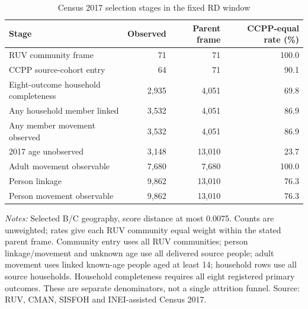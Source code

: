 \begin{table}[!htbp]\centering\small
\caption{Census 2017 selection stages in the fixed RD window}
\label{tab:rd_mechanisms_selection_flow}
\begin{tabular}{lrrr}\toprule
Stage & Observed & Parent frame & CCPP-equal rate (\%) \\
\midrule
RUV community frame &        71 &        71 & 100.0 \\
CCPP source-cohort entry &        64 &        71 &  90.1 \\
Eight-outcome household completeness &     2,935 &     4,051 &  69.8 \\
Any household member linked &     3,532 &     4,051 &  86.9 \\
Any member movement observed &     3,532 &     4,051 &  86.9 \\
2017 age unobserved &     3,148 &    13,010 &  23.7 \\
Adult movement observable &     7,680 &     7,680 & 100.0 \\
Person linkage &     9,862 &    13,010 &  76.3 \\
Person movement observable &     9,862 &    13,010 &  76.3 \\
\bottomrule\end{tabular}
\parbox{0.98\linewidth}{\footnotesize\textit{Notes:} Selected B/C geography, score distance at most 0.0075. Counts are unweighted; rates give each RUV community equal weight within the stated parent frame. Community entry uses all RUV communities; person linkage/movement and unknown age use all delivered source people; adult movement uses linked known-age people aged at least 14; household rows use all source households. Household completeness requires all eight registered primary outcomes. These are separate denominators, not a single attrition funnel. Source: RUV, CMAN, SISFOH and INEI-assisted Census 2017.}
\end{table}
